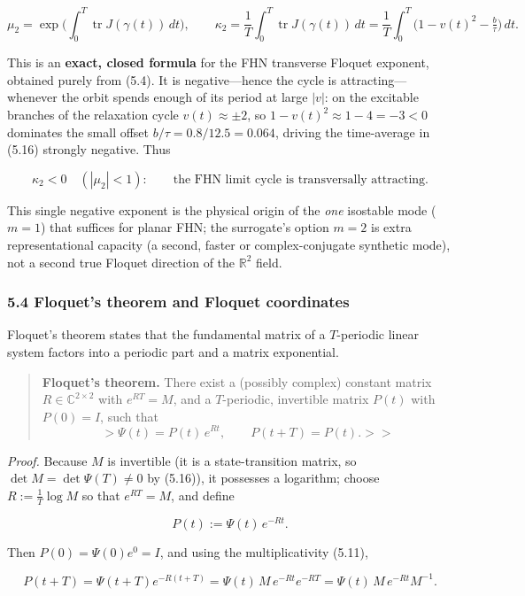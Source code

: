 \documentclass[
  11pt,
]{article}
\providecommand{\lt}{<}
\providecommand{\gt}{>}
\begin{document}
\[
\mu_2=\exp\!\Big(\int_0^T \operatorname{tr}J(\gamma(t))\,dt\Big),
\qquad
\kappa_2=\frac{1}{T}\int_0^T\operatorname{tr}J(\gamma(t))\,dt
=\frac{1}{T}\int_0^T\!\Big(1-v(t)^2-\tfrac{b}{\tau}\Big)\,dt .
\tag{5.16}
\]

This is an \textbf{exact, closed formula} for the FHN transverse Floquet
exponent, obtained purely from (5.4). It is negative---hence the cycle
is attracting---whenever the orbit spends enough of its period at large
\(|v|\): on the excitable branches of the relaxation cycle
\(v(t)\approx\pm2\), so \(1-v(t)^2\approx 1-4=-3\lt 0\) dominates the
small offset \(b/\tau=0.8/12.5=0.064\), driving the time-average in
(5.16) strongly negative. Thus

\[
\kappa_2\lt 0\quad(|\mu_2|\lt 1):\qquad\text{the FHN limit cycle is transversally attracting.}
\tag{5.17}
\]

This single negative exponent is the physical origin of the \emph{one}
isostable mode (\(m=1\)) that suffices for planar FHN; the surrogate's
option \(m=2\) is extra representational capacity (a second, faster or
complex-conjugate synthetic mode), not a second true Floquet direction
of the \(\mathbb{R}^2\) field.

\subsubsection{5.4 Floquet's theorem and Floquet
coordinates}\label{floquets-theorem-and-floquet-coordinates}

Floquet's theorem states that the fundamental matrix of a \(T\)-periodic
linear system factors into a periodic part and a matrix exponential.

\begin{quote}
\textbf{Floquet's theorem.} There exist a (possibly complex) constant
matrix \(R\in\mathbb{C}^{2\times2}\) with \(e^{RT}=M\), and a
\(T\)-periodic, invertible matrix \(P(t)\) with \(P(0)=I\), such that \[
\gt  \Psi(t)=P(t)\,e^{Rt},\qquad P(t+T)=P(t).
\gt  \tag{5.18}
\gt  \]
\end{quote}

\emph{Proof.} Because \(M\) is invertible (it is a state-transition
matrix, so \(\det M=\det\Psi(T)\neq0\) by (5.16)), it possesses a
logarithm; choose \(R:=\tfrac1T\log M\) so that \(e^{RT}=M\), and define

\[
P(t):=\Psi(t)\,e^{-Rt}.
\]

Then \(P(0)=\Psi(0)e^{0}=I\), and using the multiplicativity (5.11),

\[
P(t+T)=\Psi(t+T)e^{-R(t+T)}=\Psi(t)\,M\,e^{-Rt}e^{-RT}
=\Psi(t)\,M\,e^{-Rt}M^{-1}.
\]
\end{document}

